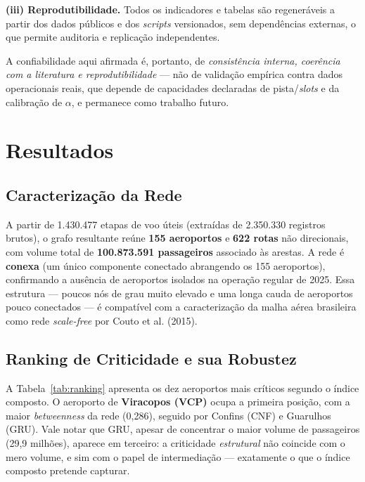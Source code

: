 \documentclass[12pt,a4paper]{article}
\begin{document}
\textbf{(iii) Reprodutibilidade.} Todos os indicadores e tabelas são regeneráveis a partir dos
dados públicos e dos \textit{scripts} versionados, sem dependências externas, o que permite
auditoria e replicação independentes.

A confiabilidade aqui afirmada é, portanto, de \emph{consistência interna, coerência com a
literatura e reprodutibilidade} --- não de validação empírica contra dados operacionais reais, que
depende de capacidades declaradas de pista/\textit{slots} e da calibração de $\alpha$, e permanece
como trabalho futuro.

\section{Resultados}
\label{sec:resultados}

\subsection{Caracterização da Rede}

A partir de 1.430.477 etapas de voo úteis (extraídas de 2.350.330 registros brutos), o grafo
resultante reúne \textbf{155 aeroportos} e \textbf{622 rotas} não direcionais, com volume total
de \textbf{100.873.591 passageiros} associado às arestas. A rede é \textbf{conexa} (um único
componente conectado abrangendo os 155 aeroportos), confirmando a ausência de aeroportos
isolados na operação regular de 2025. Essa estrutura --- poucos nós de grau muito elevado e uma
longa cauda de aeroportos pouco conectados --- é compatível com a caracterização da malha aérea
brasileira como rede \textit{scale-free} por Couto et al. (2015).

\subsection{Ranking de Criticidade e sua Robustez}

A Tabela~\ref{tab:ranking} apresenta os dez aeroportos mais críticos segundo o índice composto.
O aeroporto de \textbf{Viracopos (VCP)} ocupa a primeira posição, com a maior \textit{betweenness}
da rede (0{,}286), seguido por Confins (CNF) e Guarulhos (GRU). Vale notar que GRU, apesar de
concentrar o maior volume de passageiros (29{,}9 milhões), aparece em terceiro: a criticidade
\textit{estrutural} não coincide com o mero volume, e sim com o papel de intermediação ---
exatamente o que o índice composto pretende capturar.
\end{document}
